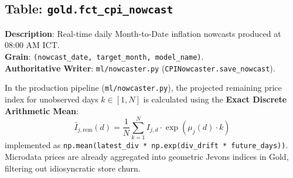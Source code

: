 \documentclass[a4paper, 11pt]{article}
\begin{document}
\subsection{Table: \texttt{gold.fct\_cpi\_nowcast}}
\textbf{Description}: Real-time daily Month-to-Date inflation nowcasts produced at 08:00 AM ICT. \\
\textbf{Grain}: \texttt{(nowcast\_date, target\_month, model\_name)}. \\
\textbf{Authoritative Writer}: \texttt{ml/nowcaster.py} (\texttt{CPINowcaster.save\_nowcast}).

\begin{tcolorbox}[title=The Exact Discrete Arithmetic Mean Projection]
In the production pipeline (\texttt{ml/nowcaster.py}), the projected remaining price index for unobserved days $k \in [1, N]$ is calculated using the \textbf{Exact Discrete Arithmetic Mean}:
\begin{equation}
\bar{I}_{j, \text{rem}}(d) = \frac{1}{N} \sum_{k=1}^N I_{j, d} \cdot \exp\left( \mu_j(d) \cdot k \right)
\end{equation}
implemented as \texttt{np.mean(latest\_div * np.exp(div\_drift * future\_days))}. Microdata prices are already aggregated into geometric Jevons indices in Gold, filtering out idiosyncratic store churn.
\end{tcolorbox}
\end{document}
